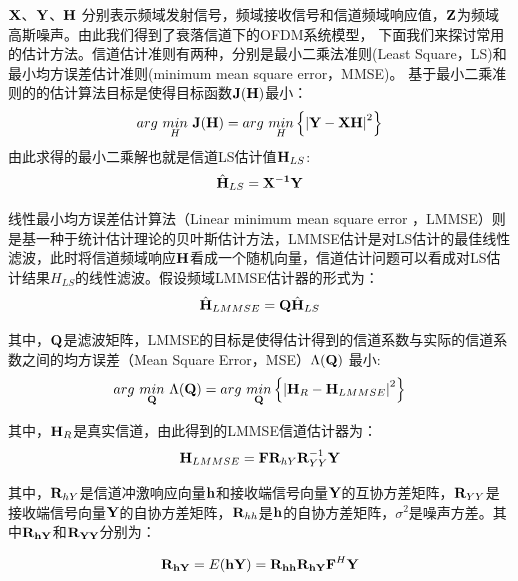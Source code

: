 $\textbf X$、$\textbf Y$、$\textbf H$
分别表示频域发射信号，频域接收信号和信道频域响应值，$\textbf Z$为频域高斯噪声。由此我们得到了衰落信道下的OFDM系统模型，
下面我们来探讨常用的估计方法。信道估计准则有两种，分别是最小二乘法准则(Least Square，LS)和最小均方误差估计准则(minimum mean square error，MMSE)。
基于最小二乘准则的的估计算法目标是使得目标函数$\bf J(H)$最小：
\begin{equation}
arg\ \underset {H}{min}\ \textbf J(\textbf H)=arg\ \underset {H}{min}\left \{  {\left |\textbf Y- \textbf X\textbf H \right|}^2\right \}
\end{equation}
由此求得的最小二乘解也就是信道LS估计值$\textbf H_{LS}$:
\begin{equation}
{\hat{\textbf H}}_{LS} =\bf X^{-1}Y
\label{equ:Least Square channel Estimation}
\end{equation}

线性最小均方误差估计算法（Linear minimum mean square error ，LMMSE）则是基一种于统计估计理论的贝叶斯估计方法，LMMSE估计是对LS估计的最佳线性滤波\cite{Yangyushan2010}，此时将信道频域响应$\textbf H$看成一个随机向量，信道估计问题可以看成对LS估计结果$H_{LS}$的线性滤波。假设频域LMMSE估计器的形式为：
\begin{equation}
{\hat{\textbf H}}_{LMMSE} =\textbf Q{\hat{\textbf H}}_{LS}
\end{equation}

其中，$\textbf Q$是滤波矩阵，LMMSE的目标是使得估计得到的信道系数与实际的信道系数之间的均方误差（Mean Square Error，MSE）$\Lambda(\textbf Q)$ 最小:
\begin{equation}
arg\ \underset {\textbf Q}{min}\ {\Lambda} (\textbf Q)=arg\ \underset {\textbf Q}{min}\left \{  {\left |\textbf H_{R}- \textbf H_{LMMSE} \right|}^2\right\}
\end{equation}

其中，$\textbf H_R$是真实信道，由此得到的LMMSE信道估计器为：
\begin{equation}
\textbf H_{LMMSE}=\textbf F \textbf R_{hY}\textbf R_{YY}^{-1}\textbf Y
\end{equation}

其中，$\textbf R_{hY}$是信道冲激响应向量$\textbf h$和接收端信号向量$\textbf Y$的互协方差矩阵，$\textbf R_{YY}$是接收端信号向量$\textbf Y$的自协方差矩阵，$\textbf R_{hh}$是$\textbf h$的自协方差矩阵，$\sigma^2$是噪声方差。其中$\textbf R_{\textbf h\textbf Y}$和$\textbf R_{\textbf Y\textbf Y}$分别为：

\begin{equation}
\begin{aligned}
\textbf R_{\textbf h\textbf Y}=E(\textbf h\textbf Y)=\textbf R_{\textbf h\textbf h}\textbf R_{\textbf h\textbf Y}{\textbf F}^{H}\textbf Y\\
\end{aligned}
\end{equation}

